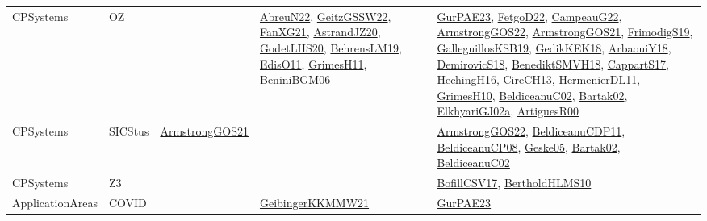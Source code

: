 {\begin{longtable}{lp{3cm}>{\raggedright}p{6cm}>{\raggedright}p{6cm}p{8cm}}
CPSystems & OZ &  & \href{articles/AbreuN22.pdf}{AbreuN22}\cite{AbreuN22}, \href{papers/GeitzGSSW22.pdf}{GeitzGSSW22}\cite{GeitzGSSW22}, \href{articles/FanXG21.pdf}{FanXG21}\cite{FanXG21}, \href{articles/AstrandJZ20.pdf}{AstrandJZ20}\cite{AstrandJZ20}, \href{papers/GodetLHS20.pdf}{GodetLHS20}\cite{GodetLHS20}, \href{papers/BehrensLM19.pdf}{BehrensLM19}\cite{BehrensLM19}, \href{papers/EdisO11.pdf}{EdisO11}\cite{EdisO11}, \href{papers/GrimesH11.pdf}{GrimesH11}\cite{GrimesH11}, \href{papers/BeniniBGM06.pdf}{BeniniBGM06}\cite{BeniniBGM06} & \href{articles/GurPAE23.pdf}{GurPAE23}\cite{GurPAE23}, \href{articles/FetgoD22.pdf}{FetgoD22}\cite{FetgoD22}, \href{articles/CampeauG22.pdf}{CampeauG22}\cite{CampeauG22}, \href{papers/ArmstrongGOS22.pdf}{ArmstrongGOS22}\cite{ArmstrongGOS22}, \href{papers/ArmstrongGOS21.pdf}{ArmstrongGOS21}\cite{ArmstrongGOS21}, \href{papers/FrimodigS19.pdf}{FrimodigS19}\cite{FrimodigS19}, \href{papers/GalleguillosKSB19.pdf}{GalleguillosKSB19}\cite{GalleguillosKSB19}, \href{articles/GedikKEK18.pdf}{GedikKEK18}\cite{GedikKEK18}, \href{papers/ArbaouiY18.pdf}{ArbaouiY18}\cite{ArbaouiY18}, \href{papers/DemirovicS18.pdf}{DemirovicS18}\cite{DemirovicS18}, \href{papers/BenediktSMVH18.pdf}{BenediktSMVH18}\cite{BenediktSMVH18}, \href{papers/CappartS17.pdf}{CappartS17}\cite{CappartS17}, \href{papers/HechingH16.pdf}{HechingH16}\cite{HechingH16}, \href{papers/CireCH13.pdf}{CireCH13}\cite{CireCH13}, \href{papers/HermenierDL11.pdf}{HermenierDL11}\cite{HermenierDL11}, \href{papers/GrimesH10.pdf}{GrimesH10}\cite{GrimesH10}, \href{papers/BeldiceanuC02.pdf}{BeldiceanuC02}\cite{BeldiceanuC02}, \href{papers/Bartak02.pdf}{Bartak02}\cite{Bartak02}, \href{papers/ElkhyariGJ02a.pdf}{ElkhyariGJ02a}\cite{ElkhyariGJ02a}, \href{articles/ArtiguesR00.pdf}{ArtiguesR00}\cite{ArtiguesR00}\\
CPSystems & SICStus & \href{papers/ArmstrongGOS21.pdf}{ArmstrongGOS21}\cite{ArmstrongGOS21} &  & \href{papers/ArmstrongGOS22.pdf}{ArmstrongGOS22}\cite{ArmstrongGOS22}, \href{articles/BeldiceanuCDP11.pdf}{BeldiceanuCDP11}\cite{BeldiceanuCDP11}, \href{papers/BeldiceanuCP08.pdf}{BeldiceanuCP08}\cite{BeldiceanuCP08}, \href{papers/Geske05.pdf}{Geske05}\cite{Geske05}, \href{papers/Bartak02.pdf}{Bartak02}\cite{Bartak02}, \href{papers/BeldiceanuC02.pdf}{BeldiceanuC02}\cite{BeldiceanuC02}\\
CPSystems & Z3 &  &  & \href{papers/BofillCSV17.pdf}{BofillCSV17}\cite{BofillCSV17}, \href{papers/BertholdHLMS10.pdf}{BertholdHLMS10}\cite{BertholdHLMS10}\\
ApplicationAreas & COVID &  & \href{papers/GeibingerKKMMW21.pdf}{GeibingerKKMMW21}\cite{GeibingerKKMMW21} & \href{articles/GurPAE23.pdf}{GurPAE23}\cite{GurPAE23}\\

\end{longtable}}
